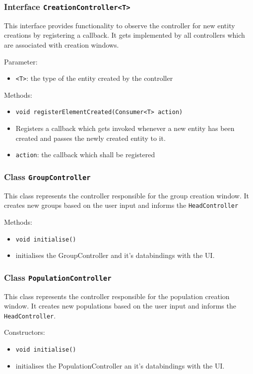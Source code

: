 \documentclass[parskip=full,11pt]{scrartcl}
\begin{document}
\subsubsection{Interface \texttt{CreationController<T>}}

This interface provides functionality to observe the controller for new entity creations by registering a callback. It gets implemented by all controllers which are associated with creation windows.

Parameter:
\begin{itemize} \itemsep -10pt
	\item \texttt{<T>}: the type of the entity created by the controller
\end{itemize}

Methods:
\begin{itemize}\itemsep -10pt
\item \texttt{void registerElementCreated(Consumer<T> action)}
\item[] Registers a callback which gets invoked whenever a new entity has been created and passes the newly created entity to it.
\item[] \texttt{action}: the callback which shall be registered
\end{itemize}

\subsubsection{Class \texttt{GroupController}}
This class represents the controller responsible for the group creation window. It creates new groups based on the user input and informs the \texttt{HeadController}

Methods:
\begin{itemize}\itemsep -10pt
\item \texttt{void initialise()}
\item[] initialises the GroupController and it's databindings with the UI.
\end{itemize}

\subsubsection{Class \texttt{PopulationController}}
This class represents the controller responsible for the population creation window. It creates new populations based on the user input and informs the \texttt{HeadController}.

Constructors:
\begin{itemize}\itemsep -10pt
\item \texttt{void initialise()}
\item[] initialises the PopulationController an it's databindings with the UI.
\end{itemize}
\end{document}
